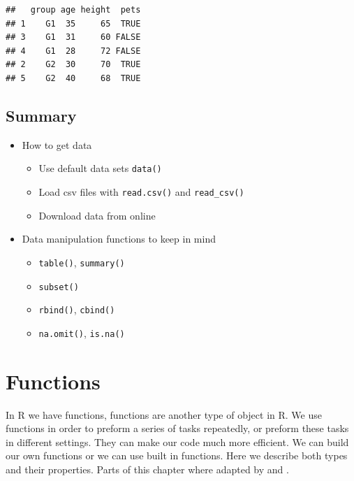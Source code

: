\documentclass[
]{book}
\providecommand{\tightlist}{%
  \setlength{\itemsep}{0pt}\setlength{\parskip}{0pt}}
\begin{document}
\begin{verbatim}
##   group age height  pets
## 1    G1  35     65  TRUE
## 3    G1  31     60 FALSE
## 4    G1  28     72 FALSE
## 2    G2  30     70  TRUE
## 5    G2  40     68  TRUE
\end{verbatim}

\hypertarget{summary-4}{%
\section*{Summary}\label{summary-4}}

\begin{itemize}
\tightlist
\item
  How to get data

  \begin{itemize}
  \tightlist
  \item
    Use default data sets \texttt{data()}
  \item
    Load csv files with \texttt{read.csv()} and \texttt{read\_csv()}
  \item
    Download data from online
  \end{itemize}
\item
  Data manipulation functions to keep in mind

  \begin{itemize}
  \tightlist
  \item
    \texttt{table()}, \texttt{summary()}
  \item
    \texttt{subset()}
  \item
    \texttt{rbind()}, \texttt{cbind()}
  \item
    \texttt{na.omit()}, \texttt{is.na()}
  \end{itemize}
\end{itemize}

\hypertarget{functions}{%
\chapter{Functions}\label{functions}}

In R we have functions, functions are another type of object in R. We use functions in order to preform a series of tasks repeatedly, or preform these tasks in different settings. They can make our code much more efficient. We can build our own functions or we can use built in functions. Here we describe both types and their properties. Parts of this chapter where adapted by \citet{r-func} and \citet{dummies2015}.
\end{document}
